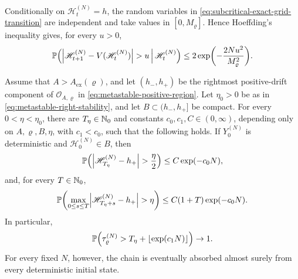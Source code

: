 \documentclass[11pt,reqno,a4paper]{article}
\newcommand{\Pp}{\P}
\begin{document}
Conditionally on $\mathscr H_t^{(N)}=h$, the random variables in
\cref{eq:subcritical-exact-grid-transition} are independent and take values
in $[0,M_\varrho]$. Hence Hoeffding's inequality gives, for every $u>0$,
\begin{equation}\label{eq:metastable-hoeffding}
  \Pp\left(
    \abs{\mathscr H_{t+1}^{(N)}-V(\mathscr H_t^{(N)})}>u
    \,\middle|\, \mathscr H_t^{(N)}
  \right)
  \leq
  2\exp\left(-\frac{2Nu^2}{M_\varrho^2}\right).
\end{equation}

\begin{theorem}
\label{thm:rounded-qualitative-metastability}
  Assume that $A>A_{\mathrm{ex}}(\varrho)$, and let
  $(h_-,h_+)$ be the rightmost positive-drift component of
  $\mathcal O_{A,\varrho}$ in
  \cref{eq:metastable-positive-region}. Let
  $\eta_0>0$ be as in \cref{eq:metastable-right-stability}, and let
  $B\subset(h_-,h_+]$ be compact. For every $0<\eta<\eta_0$,
  there are $T_\eta\in\mathbb{N}_0$ and constants $c_0,c_1,C\in(0,\infty)$, depending
  only on $A,\varrho,B,\eta$, with $c_1<c_0$, such that the following holds. If
  $Y_0^{(N)}$ is deterministic and
  $\mathscr H_0^{(N)}\in B$, then
  \begin{equation}\label{eq:metastable-entrance-probability}
    \Pp\left(
      \abs{\mathscr H_{T_\eta}^{(N)}-h_+}>\frac\eta2
    \right)
    \leq
    C\exp(-c_0N),
  \end{equation}
  and, for every $T\in\mathbb{N}_0$,
  \begin{equation}\label{eq:metastable-exit-probability}
    \Pp\left(
      \max_{0\leq s\leq T}
      \abs{\mathscr H_{T_\eta+s}^{(N)}-h_+}>\eta
    \right)
    \leq
    C(1+T)\exp(-c_0N).
  \end{equation}
  In particular,
  \begin{equation}\label{eq:metastable-exponential-survival}
    \Pp\left(
      \tau_\varrho^{(N)}
      >
      T_\eta+\lfloor\exp(c_1N)\rfloor
    \right)
    \to1 .
  \end{equation}
  For every fixed $N$, however, the chain is eventually absorbed almost surely
  from every deterministic initial state.
\end{theorem}
\end{document}
